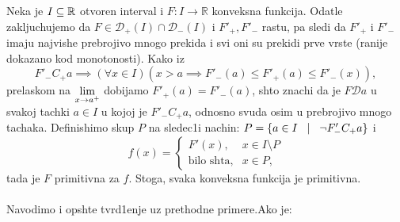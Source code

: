 \documentclass[../main_og.tex]{subfiles}
\begin{document}
{\pr Neka je $I\subseteq \mathbb{R}$ otvoren interval i $F:I\to\mathbb{R}$ konveksna funkcija. Odatle zakljuchujemo da $F\in \mathscr{D}_{+}(I) \cap \mathscr{D}_{-}(I)$ i $F'_{+}, F'_{-}$ rastu, pa sledi da $F'_{+}$ i $F'_{-}$ imaju najvishe prebrojivo mnogo prekida i svi oni su prekidi prve vrste (ranije dokazano kod monotonosti). Kako iz 
$$F'_{-}C_{+}a \implies (\forall x \in I) (x>a \implies F'_{-}(a)\leqslant F'_{+}(a) \leqslant F'_{-}(x)),$$
prelaskom na $\displaystyle{\lim_{x\to a^{+}}}$ dobijamo $F'_{+}(a) = F'_{-}(a)$, shto znachi da je $F \mathscr{D} a$ u svakoj tachki $a\in I$ u kojoj je $F'_{-}C_{+}a$, odnosno svuda osim u prebrojivo mnogo tachaka. Definishimo skup $P$ na sledec1i nachin: $P=\{a\in I \hspace{0.3cm} | \hspace{0.3cm} \lnot F'_{-}C_{+}a\} $ i 
$$f(x)=\begin{cases}
			F'(x), & x\in I\setminus P\\
            \textrm{bilo shta}, & x\in P,
		 \end{cases}$$
tada je $F$ primitivna za $f$. Stoga, svaka konveksna funkcija je primitivna.}\\ \\
\nap Navodimo i opshte tvrd1enje uz prethodne primere.Ako je:
\end{document}
